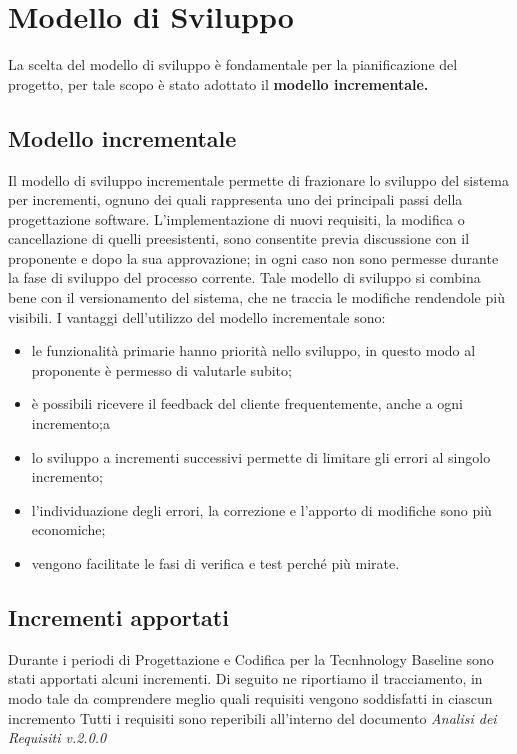 \section{Modello di Sviluppo}
La scelta del modello di sviluppo è fondamentale per la pianificazione del progetto, per tale scopo è stato adottato il \textbf{modello incrementale.}

\subsection{Modello incrementale}
Il modello di sviluppo incrementale permette di frazionare lo sviluppo del sistema per incrementi, ognuno dei quali rappresenta uno dei principali passi della progettazione software.
L'implementazione di nuovi requisiti, la modifica o cancellazione di quelli preesistenti, sono consentite previa discussione con il proponente e dopo la sua approvazione; in ogni caso non sono permesse durante la fase di sviluppo del processo corrente.
Tale modello di sviluppo si combina bene con il versionamento del sistema, che ne traccia le modifiche rendendole più visibili.
I vantaggi dell'utilizzo del modello incrementale sono:
\begin{itemize}
    \item le funzionalità primarie hanno priorità nello sviluppo, in questo modo al proponente è permesso di valutarle subito;
    \item è possibili ricevere il feedback del cliente frequentemente, anche a ogni incremento;a
    \item lo sviluppo a incrementi successivi permette di limitare gli errori al singolo incremento;
    \item l'individuazione degli errori, la correzione e l'apporto di modifiche sono più economiche;
    \item vengono facilitate le fasi di verifica e test perché più mirate.
\end{itemize}

\subsection{Incrementi apportati}
Durante i periodi di Progettazione e Codifica per la Tecnhnology Baseline sono stati apportati alcuni incrementi. Di seguito ne riportiamo il tracciamento, in modo tale da comprendere meglio quali requisiti vengono soddisfatti in ciascun incremento 
\newline 
Tutti i requisiti sono reperibili all'interno del documento \textit{Analisi dei Requisiti v.2.0.0}


